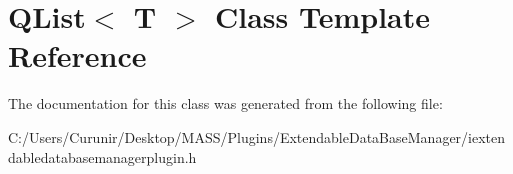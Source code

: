 \hypertarget{class_q_list}{}\section{Q\+List$<$ T $>$ Class Template Reference}
\label{class_q_list}


The documentation for this class was generated from the following file\+:\begin{DoxyCompactItemize}
\item 
C\+:/\+Users/\+Curunir/\+Desktop/\+M\+A\+S\+S/\+Plugins/\+Extendable\+Data\+Base\+Manager/iextendabledatabasemanagerplugin.\+h\end{DoxyCompactItemize}
